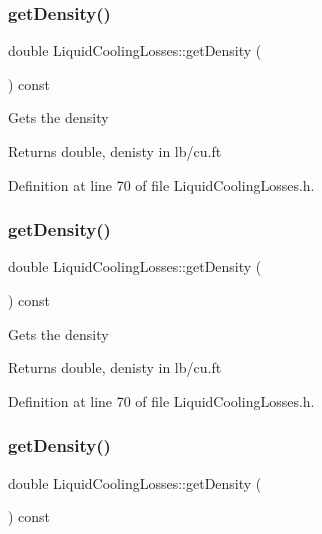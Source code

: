 \subsubsection{\texorpdfstring{get\+Density()}{getDensity()}\hspace{0.1cm}{\footnotesize\ttfamily [1/3]}}
{\footnotesize\ttfamily double Liquid\+Cooling\+Losses\+::get\+Density (\begin{DoxyParamCaption}{ }\end{DoxyParamCaption}) const\hspace{0.3cm}{\ttfamily [inline]}}

Gets the density \begin{DoxyReturn}{Returns}
double, denisty in lb/cu.\+ft 
\end{DoxyReturn}


Definition at line 70 of file Liquid\+Cooling\+Losses.\+h.

\mbox{\label{class_liquid_cooling_losses_ab2a34915eeba8bcea46d67a72cbe17d2}} 
\subsubsection{\texorpdfstring{get\+Density()}{getDensity()}\hspace{0.1cm}{\footnotesize\ttfamily [2/3]}}
{\footnotesize\ttfamily double Liquid\+Cooling\+Losses\+::get\+Density (\begin{DoxyParamCaption}{ }\end{DoxyParamCaption}) const\hspace{0.3cm}{\ttfamily [inline]}}

Gets the density \begin{DoxyReturn}{Returns}
double, denisty in lb/cu.\+ft 
\end{DoxyReturn}


Definition at line 70 of file Liquid\+Cooling\+Losses.\+h.

\mbox{\label{class_liquid_cooling_losses_ab2a34915eeba8bcea46d67a72cbe17d2}} 
\subsubsection{\texorpdfstring{get\+Density()}{getDensity()}\hspace{0.1cm}{\footnotesize\ttfamily [3/3]}}
{\footnotesize\ttfamily double Liquid\+Cooling\+Losses\+::get\+Density (\begin{DoxyParamCaption}{ }\end{DoxyParamCaption}) const\hspace{0.3cm}{\ttfamily [inline]}}

